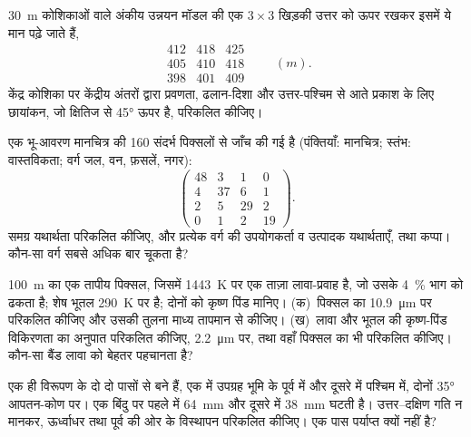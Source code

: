 \begin{exercise}[$\star\star$]\label{exo:b3:remote-sensing-gis:7}
\qty{30}{m} कोशिकाओं वाले अंकीय उन्नयन मॉडल की एक $3\times3$ खिड़की
उत्तर को ऊपर रखकर इसमें ये मान पढ़े जाते हैं,
\[
\begin{matrix} 412 & 418 & 425 \\ 405 & 410 & 418 \\ 398 & 401 & 409 \end{matrix}
\qquad (\unit{m}).
\]
केंद्र कोशिका पर केंद्रीय अंतरों द्वारा प्रवणता, ढलान-दिशा
और उत्तर-पश्चिम से आते प्रकाश के लिए छायांकन, जो
क्षितिज से \ang{45} ऊपर है, परिकलित कीजिए।
\end{exercise}

\begin{exercise}[$\star\star$]\label{exo:b3:remote-sensing-gis:8}
एक भू-आवरण मानचित्र की 160 संदर्भ पिक्सलों से जाँच की गई है (पंक्तियाँ: मानचित्र;
स्तंभ: वास्तविकता; वर्ग जल, वन, फ़सलें, नगर):
\[
\begin{pmatrix} 48 & 3 & 1 & 0 \\ 4 & 37 & 6 & 1 \\ 2 & 5 & 29 & 2 \\ 0 & 1 & 2 & 19 \end{pmatrix} .
\]
समग्र यथार्थता परिकलित कीजिए, और प्रत्येक वर्ग की उपयोगकर्ता व उत्पादक यथार्थताएँ,
तथा कप्पा। कौन-सा वर्ग सबसे अधिक बार चूकता है?
\end{exercise}

\begin{exercise}[$\star\star$]\label{exo:b3:remote-sensing-gis:9}
\qty{100}{m} का एक तापीय पिक्सल, जिसमें \qty{1443}{K} पर एक ताज़ा लावा-प्रवाह है,
जो उसके \qty{4}{\percent} भाग को ढकता है; शेष भूतल \qty{290}{K} पर है; दोनों को
कृष्ण पिंड मानिए। (क)~पिक्सल का
\qty{10.9}{\micro\metre} पर  परिकलित कीजिए और उसकी तुलना माध्य तापमान से कीजिए।
(ख)~लावा और भूतल की कृष्ण-पिंड विकिरणता का अनुपात परिकलित कीजिए,
\qty{2.2}{\micro\metre} पर, तथा वहाँ पिक्सल का  भी
परिकलित कीजिए। कौन-सा बैंड लावा को बेहतर पहचानता है?
\end{exercise}

\begin{exercise}[$\star\star\star$]\label{exo:b3:remote-sensing-gis:10}
एक ही विरूपण के दो  दो पासों से बने हैं, एक में उपग्रह भूमि के पूर्व में
और दूसरे में पश्चिम में, दोनों
\ang{35} आपतन-कोण पर। एक बिंदु पर  पहले में
\qty{64}{mm} और दूसरे में \qty{38}{mm} घटती है।
उत्तर--दक्षिण गति न मानकर, ऊर्ध्वाधर तथा
पूर्व की ओर के विस्थापन परिकलित कीजिए। एक पास पर्याप्त क्यों नहीं है?
\end{exercise}

